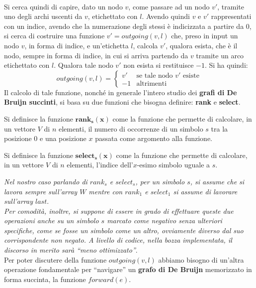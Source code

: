 \documentclass[a4paper,12pt, oneside]{book}
\begin{document}
\\
\noindent
Si cerca quindi di capire, dato un nodo $v$, come passare ad un nodo $v'$,
tramite uno degli archi uscenti da $v$, etichettato con $l$. Avendo quindi $v$ e
$v'$ rappresentati con un indice, avendo che la numerazione degli stessi è
indicizzata a partire da 0, si cerca di costruire una funzione
$v'=outgoing(v,l)$ che, preso in input un nodo $v$, in forma di indice, e
un'etichetta $l$, calcola $v'$, qualora esista, che è il nodo, sempre in forma
di indice, in cui si arriva partendo da $v$ tramite un arco etichettato con
$l$. Qualora tale nodo $v'$ non esista si restituisce $-1$. Si ha quindi:
\[outgoing(v,l)=
  \begin{cases}
    v' &\mbox{se tale nodo $v'$ esiste}\\
    -1 &\mbox{altrimenti}
  \end{cases}
\]
Il calcolo di tale funzione, nonché in generale l'intero studio dei
\textbf{grafi di De Bruijn succinti}, si basa su due funzioni che bisogna
definire: 
\textbf{rank} e \textbf{select}.
\begin{definizione}
  Si definisce la funzione $\mathbf{rank_s(x)}$ come la funzione che permette di
  calcolare, in un vettore $V$ di $n$ elementi, il numero di occorrenze
  di un simbolo $s$ tra la posizione 0 e una posizione $x$ passata come
  argomento alla funzione.
\end{definizione}
\begin{definizione}
  Si definisce la funzione $\mathbf{select_s(x)}$ come la funzione che permette
  di calcolare, in un vettore $V$ di $n$ elementi, l'indice dell'$x$-esimo
  simbolo uguale a $s$.
\end{definizione}
\noindent
\textit{Nel nostro caso parlando di $rank_s$ e $select_s$, per un simbolo $s$,
  si assume che si lavora sempre sull'array $W$ mentre con $rank_1$ e $select_1$
  si assume di lavorare sull'array $last$}.\\
\textit{Per comodità, inoltre, si suppone di essere in grado di effettuare
  queste due operazioni anche su un simbolo $s$ marcato come negativo senza
  ulteriori specifiche, come se fosse un simbolo come un altro, ovviamente
  diverso dal suo corrispondente non negato. A livello di codice, nella bozza
  implementata, il discorso in merito sarà ``meno ottimizzato''}.\\
Per poter discutere della funzione $outgoing(v,l)$ abbiamo bisogno di un'altra
operazione fondamentale per ``navigare'' un \textbf{grafo di De Bruijn}
memorizzato in forma succinta, la funzione $forward(e)$.
\end{document}
